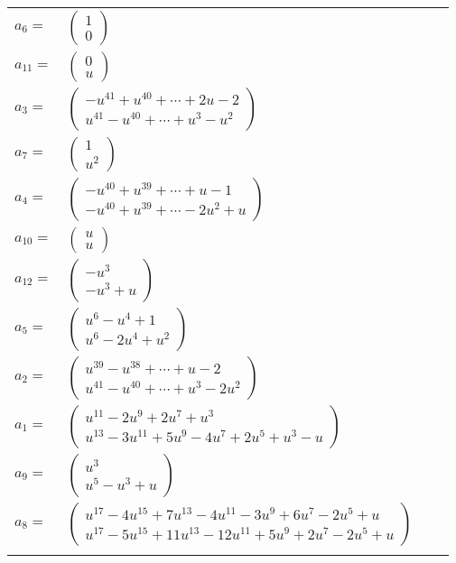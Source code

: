 \documentclass[1p]{elsarticle_modified}
\theoremstyle{definition}
\begin{document}
\begin{tabular}{m{7pt} m{180pt} m{7pt} m{180pt} }
\flushright $a_{6}=$&$\begin{pmatrix}1\\0\end{pmatrix}$ \\
\flushright $a_{11}=$&$\begin{pmatrix}0\\u\end{pmatrix}$ \\
\flushright $a_{3}=$&$\begin{pmatrix}- u^{41}+u^{40}+\cdots+2 u-2\\u^{41}- u^{40}+\cdots+u^3- u^2\end{pmatrix}$ \\
\flushright $a_{7}=$&$\begin{pmatrix}1\\u^2\end{pmatrix}$ \\
\flushright $a_{4}=$&$\begin{pmatrix}- u^{40}+u^{39}+\cdots+u-1\\- u^{40}+u^{39}+\cdots-2 u^2+u\end{pmatrix}$ \\
\flushright $a_{10}=$&$\begin{pmatrix}u\\u\end{pmatrix}$ \\
\flushright $a_{12}=$&$\begin{pmatrix}- u^3\\- u^3+u\end{pmatrix}$ \\
\flushright $a_{5}=$&$\begin{pmatrix}u^6- u^4+1\\u^6-2 u^4+u^2\end{pmatrix}$ \\
\flushright $a_{2}=$&$\begin{pmatrix}u^{39}- u^{38}+\cdots+u-2\\u^{41}- u^{40}+\cdots+u^3-2 u^2\end{pmatrix}$ \\
\flushright $a_{1}=$&$\begin{pmatrix}u^{11}-2 u^9+2 u^7+u^3\\u^{13}-3 u^{11}+5 u^9-4 u^7+2 u^5+u^3- u\end{pmatrix}$ \\
\flushright $a_{9}=$&$\begin{pmatrix}u^3\\u^5- u^3+u\end{pmatrix}$ \\
\flushright $a_{8}=$&$\begin{pmatrix}u^{17}-4 u^{15}+7 u^{13}-4 u^{11}-3 u^9+6 u^7-2 u^5+u\\u^{17}-5 u^{15}+11 u^{13}-12 u^{11}+5 u^9+2 u^7-2 u^5+u\end{pmatrix}$\\&\end{tabular}
\end{document}
